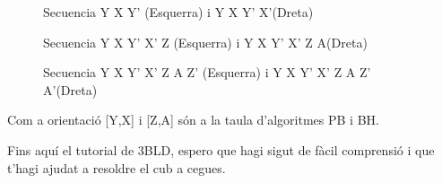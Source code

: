 \begin{figure}[h!]
    \centering
    \begin{subfigure}
        \centering\RubikCubeSolvedWY
    \end{subfigure}
    \begin{subfigure}
        \centering\RubikCubeSolvedWY
    \end{subfigure}
    \caption{Secuencia Y X Y' (Esquerra) i Y X Y' X'(Dreta)}
\end{figure}

\begin{figure}[h!]
    \centering
    \begin{subfigure}
        \centering\RubikCubeSolvedWY
    \end{subfigure}
    \begin{subfigure}
        \centering\RubikCubeSolvedWY
    \end{subfigure}
    \caption{Secuencia Y X Y' X' Z (Esquerra) i Y X Y' X' Z A(Dreta)}
\end{figure}

\begin{figure}[h!]
    \centering
    \begin{subfigure}
        \centering\RubikCubeSolvedWY
    \end{subfigure}
    \begin{subfigure}
        \centering\RubikCubeSolvedWY
    \end{subfigure}
    \caption{Secuencia Y X Y' X' Z A Z' (Esquerra) i Y X Y' X' Z A Z' A'(Dreta)}
\end{figure}

Com a orientació [Y,X] i [Z,A] són a la taula d'algoritmes PB i BH.

\newpage
\large{Fins aquí el tutorial de 3BLD, espero que hagi sigut de fàcil comprensió i que t'hagi ajudat a resoldre el cub a cegues.}